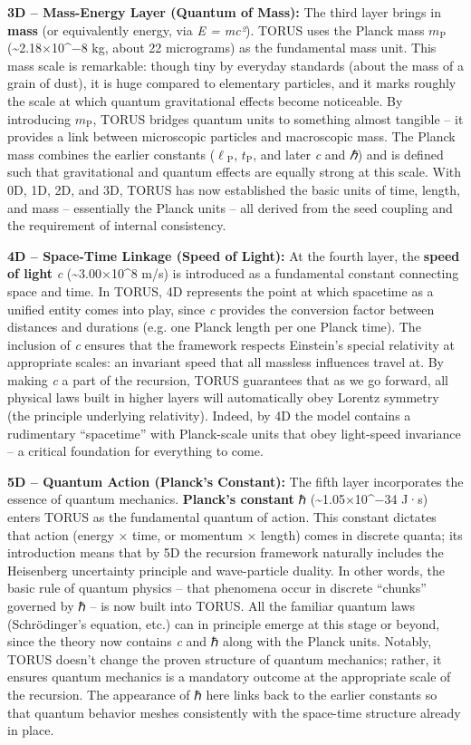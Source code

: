 \documentclass[]{article}
\newcommand{\subscript}[1]{\ensuremath{_{\mathrm{#1}}}}
\begin{document}
\textbf{3D -- Mass-Energy Layer (Quantum of Mass):} The third layer
brings in \textbf{mass} (or equivalently energy, via \emph{E = mc²}).
TORUS uses the Planck mass
$m\subscript{P}$ (\textasciitilde{}2.18×10\^{}−8 kg, about 22 micrograms) as the
fundamental mass unit. This mass scale is remarkable: though tiny by
everyday standards (about the mass of a grain of dust), it is huge
compared to elementary particles, and it marks roughly the scale at
which quantum gravitational effects become noticeable. By introducing
$m\subscript{P}$,
TORUS bridges quantum units to something almost tangible -- it provides
a link between microscopic particles and macroscopic mass. The Planck
mass combines the earlier constants
($\ell\subscript{P}$,
$t\subscript{P}$, and
later \emph{c} and \emph{ℏ}) and is defined such that gravitational and
quantum effects are equally strong at this scale. With 0D, 1D, 2D, and
3D, TORUS has now established the basic units of time, length, and mass
-- essentially the Planck units -- all derived from the seed coupling
and the requirement of internal consistency.

\textbf{4D -- Space-Time Linkage (Speed of Light):} At the fourth layer,
the \textbf{speed of light} \emph{c} (\textasciitilde{}3.00×10\^{}8 m/s)
is introduced as a fundamental constant connecting space and time. In
TORUS, 4D represents the point at which spacetime as a unified entity
comes into play, since \emph{c} provides the conversion factor between
distances and durations (e.g. one Planck length per one Planck time).
The inclusion of \emph{c} ensures that the framework respects Einstein's
special relativity at appropriate scales: an invariant speed that all
massless influences travel at. By making \emph{c} a part of the
recursion, TORUS guarantees that as we go forward, all physical laws
built in higher layers will automatically obey Lorentz symmetry (the
principle underlying relativity). Indeed, by 4D the model contains a
rudimentary ``spacetime'' with Planck-scale units that obey light-speed
invariance -- a critical foundation for everything to come.

\textbf{5D -- Quantum Action (Planck's Constant):} The fifth layer
incorporates the essence of quantum mechanics. \textbf{Planck's
constant} ℏ (\textasciitilde{}1.05×10\^{}−34 J·s) enters TORUS as the
fundamental quantum of action. This constant dictates that action
(energy × time, or momentum × length) comes in discrete quanta; its
introduction means that by 5D the recursion framework naturally includes
the Heisenberg uncertainty principle and wave-particle duality. In other
words, the basic rule of quantum physics -- that phenomena occur in
discrete ``chunks'' governed by ℏ -- is now built into TORUS. All the
familiar quantum laws (Schrödinger's equation, etc.) can in principle
emerge at this stage or beyond, since the theory now contains \emph{c}
and ℏ along with the Planck units. Notably, TORUS doesn't change the
proven structure of quantum mechanics; rather, it ensures quantum
mechanics is a mandatory outcome at the appropriate scale of the
recursion. The appearance of ℏ here links back to the earlier constants
so that quantum behavior meshes consistently with the space-time
structure already in place.
\end{document}
